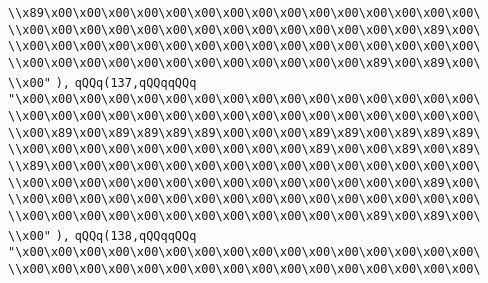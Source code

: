 \verb|\\x89\x00\x00\x00\x00\x00\x00\x00\x00\x00\x00\x00\x00\x00\x00\x00\|\newline
\verb|\\x00\x00\x00\x00\x00\x00\x00\x00\x00\x00\x00\x00\x00\x00\x89\x00\|\newline
\verb|\\x00\x00\x00\x00\x00\x00\x00\x00\x00\x00\x00\x00\x00\x00\x00\x00\|\newline
\verb|\\x00\x00\x00\x00\x00\x00\x00\x00\x00\x00\x00\x00\x89\x00\x89\x00\|\newline
\verb|\\x00"|\newline
\verb|),|\newline
\verb|qQQq(137,qQQqqQQq|\newline
\verb|"\x00\x00\x00\x00\x00\x00\x00\x00\x00\x00\x00\x00\x00\x00\x00\x00\|\newline
\verb|\\x00\x00\x00\x00\x00\x00\x00\x00\x00\x00\x00\x00\x00\x00\x00\x00\|\newline
\verb|\\x00\x89\x00\x89\x89\x89\x89\x00\x00\x00\x89\x89\x00\x89\x89\x89\|\newline
\verb|\\x00\x00\x00\x00\x00\x00\x00\x00\x00\x00\x89\x00\x00\x89\x00\x89\|\newline
\verb|\\x89\x00\x00\x00\x00\x00\x00\x00\x00\x00\x00\x00\x00\x00\x00\x00\|\newline
\verb|\\x00\x00\x00\x00\x00\x00\x00\x00\x00\x00\x00\x00\x00\x00\x89\x00\|\newline
\verb|\\x00\x00\x00\x00\x00\x00\x00\x00\x00\x00\x00\x00\x00\x00\x00\x00\|\newline
\verb|\\x00\x00\x00\x00\x00\x00\x00\x00\x00\x00\x00\x00\x89\x00\x89\x00\|\newline
\verb|\\x00"|\newline
\verb|),|\newline
\verb|qQQq(138,qQQqqQQq|\newline
\verb|"\x00\x00\x00\x00\x00\x00\x00\x00\x00\x00\x00\x00\x00\x00\x00\x00\|\newline
\verb|\\x00\x00\x00\x00\x00\x00\x00\x00\x00\x00\x00\x00\x00\x00\x00\x00\|\newline

